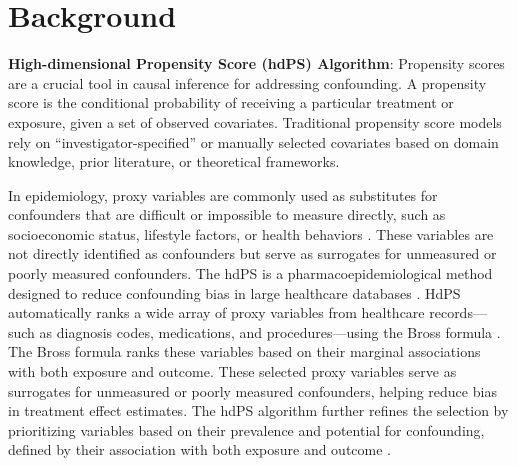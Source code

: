 \documentclass[sn-vancouver,Numbered,lineno,pdflatex]{sn-jnl}
\begin{document}



\maketitle

\section{Background}\label{background}

\textbf{High-dimensional Propensity Score (hdPS) Algorithm}: Propensity
scores are a crucial tool in causal inference for addressing
confounding. A propensity score is the conditional probability of
receiving a particular treatment or exposure, given a set of observed
covariates. Traditional propensity score models rely on
``investigator-specified'' or manually selected covariates based on
domain knowledge, prior literature, or theoretical frameworks.

In epidemiology, proxy variables are commonly used as substitutes for
confounders that are difficult or impossible to measure directly, such
as socioeconomic status, lifestyle factors, or health behaviors
\citep{vanderweele2019principles}. These variables are not directly
identified as confounders but serve as surrogates for unmeasured or
poorly measured confounders. The hdPS is a pharmacoepidemiological
method designed to reduce confounding bias in large healthcare databases
\citep{schneeweiss2009high}. HdPS automatically ranks a wide array of
proxy variables from healthcare records---such as diagnosis codes,
medications, and procedures---using the Bross formula
\citep{wyss2018erratum, bross1966spurious}. The Bross formula ranks
these variables based on their marginal associations with both exposure
and outcome. These selected proxy variables serve as surrogates for
unmeasured or poorly measured confounders, helping reduce bias in
treatment effect estimates. The hdPS algorithm further refines the
selection by prioritizing variables based on their prevalence and
potential for confounding, defined by their association with both
exposure and outcome \citep{schneeweiss2009high}.
\end{document}
